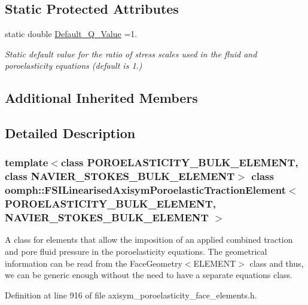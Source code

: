 \subsection*{Static Protected Attributes}
\begin{DoxyCompactItemize}
\item 
static double \hyperlink{classoomph_1_1FSILinearisedAxisymPoroelasticTractionElement_aa210d70794a163cb3ffb5f335b0f1937}{Default\+\_\+\+Q\+\_\+\+Value} =1.
\begin{DoxyCompactList}\small\item\em Static default value for the ratio of stress scales used in the fluid and poroelasticity equations (default is 1.) \end{DoxyCompactList}\end{DoxyCompactItemize}
\subsection*{Additional Inherited Members}


\subsection{Detailed Description}
\subsubsection*{template$<$class P\+O\+R\+O\+E\+L\+A\+S\+T\+I\+C\+I\+T\+Y\+\_\+\+B\+U\+L\+K\+\_\+\+E\+L\+E\+M\+E\+NT, class N\+A\+V\+I\+E\+R\+\_\+\+S\+T\+O\+K\+E\+S\+\_\+\+B\+U\+L\+K\+\_\+\+E\+L\+E\+M\+E\+NT$>$\newline
class oomph\+::\+F\+S\+I\+Linearised\+Axisym\+Poroelastic\+Traction\+Element$<$ P\+O\+R\+O\+E\+L\+A\+S\+T\+I\+C\+I\+T\+Y\+\_\+\+B\+U\+L\+K\+\_\+\+E\+L\+E\+M\+E\+N\+T, N\+A\+V\+I\+E\+R\+\_\+\+S\+T\+O\+K\+E\+S\+\_\+\+B\+U\+L\+K\+\_\+\+E\+L\+E\+M\+E\+N\+T $>$}

A class for elements that allow the imposition of an applied combined traction and pore fluid pressure in the poroelasticity equations. The geometrical information can be read from the Face\+Geometry$<$\+E\+L\+E\+M\+E\+N\+T$>$ class and thus, we can be generic enough without the need to have a separate equations class. 

Definition at line 916 of file axisym\+\_\+poroelasticity\+\_\+face\+\_\+elements.\+h.



